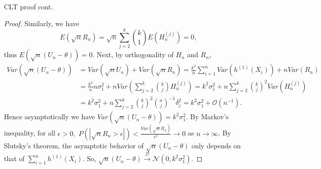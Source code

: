 \documentclass{beamer}
\theoremstyle{definition}
\numberwithin{Def}{section}
\begin{document}
      \begin{frame}{CLT proof cont. }
      \begin{fontsize}{7}{12}
      \begin{proof}
        Similarly, we have $$E(\sqrt{n}R_n) = \sqrt{n} \sum_{j = 2}^k {k \choose 1} E(H_n^{(j)}) = 0,$$
      thus $E\left( \sqrt{n}(U_n - \theta) \right) = 0. $ 
      Next, by orthogonality of $H_n$ and $R_n$,
      \begin{align*}
          Var(\sqrt{n}(U_n - \theta) ) &= Var(\sqrt{n} U_n) + Var(\sqrt{n}R_n) 
          = \frac{k^2}{n} \sum_{i = 1}^n Var(h^{(1)} (X_i) )  + n Var(R_n) \\
          &= \frac{k^2}{n} n \sigma_1^2 + n Var( \sum_{j = 2}^k {k \choose j} H_n^{(j)}) 
          = k^2 \sigma_1^2 + n \sum_{j = 2}^k {k \choose j}^2 Var(H_n^{(j)}) \\
          &= k^2 \sigma_1^2 + n \sum_{j = 2}^k {k \choose j}^2 {n \choose j}^{-1} \delta_j^2 
          = k^2 \sigma_1^2 + \mathcal{O}(n^{-1}).
      \end{align*}
      Hence asymptotically we have $Var(\sqrt{n}(U_n - \theta) ) = k^2 \sigma_1^2$. 
      By Markov's inequality, for all $\epsilon > 0,$ $P(|\sqrt{n}R_n > \epsilon| ) < \frac{Var(\sqrt{n} R_n)}{\epsilon^2} \rightarrow 0$ as $n \rightarrow \infty$.
      By Slutsky's theorem, the asymptotic behavior of $\sqrt{n}(U_n - \theta)$ only depends on that of $ \sum_{i = 1}^{n}h^{(1)} (X_i)$. So, $ \sqrt{n}(U_n - \theta) \xrightarrow{\mathcal{D}} \mathcal{N}(0, k^2 \sigma_1^2 ).$
    \end{proof}
    \end{fontsize}
\end{frame}

    
\end{document}
